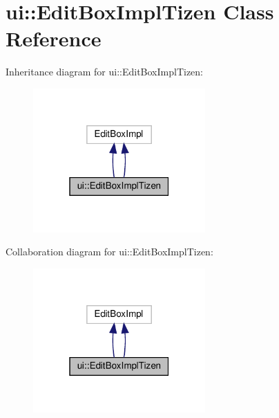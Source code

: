 \hypertarget{classui_1_1EditBoxImplTizen}{}\section{ui\+:\+:Edit\+Box\+Impl\+Tizen Class Reference}
\label{classui_1_1EditBoxImplTizen}


Inheritance diagram for ui\+:\+:Edit\+Box\+Impl\+Tizen\+:
\nopagebreak
\begin{figure}[H]
\begin{center}
\leavevmode
\includegraphics[width=187pt]{classui_1_1EditBoxImplTizen__inherit__graph}
\end{center}
\end{figure}


Collaboration diagram for ui\+:\+:Edit\+Box\+Impl\+Tizen\+:
\nopagebreak
\begin{figure}[H]
\begin{center}
\leavevmode
\includegraphics[width=187pt]{classui_1_1EditBoxImplTizen__coll__graph}
\end{center}
\end{figure}
